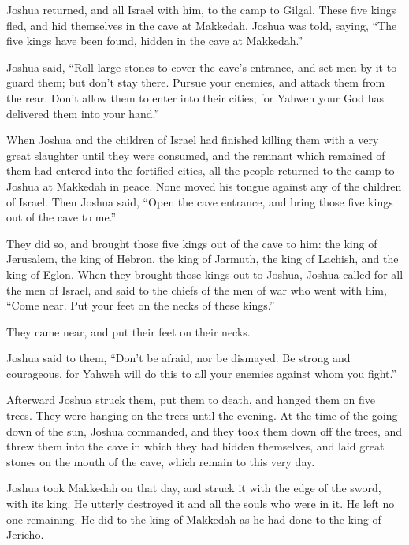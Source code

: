  Joshua returned, and all Israel with him, to the camp to
Gilgal.  These five kings fled, and hid themselves in the
cave at Makkedah.  Joshua was told, saying, ``The five
kings have been found, hidden in the cave at Makkedah.''

 Joshua said, ``Roll large stones to cover the cave's
entrance, and set men by it to guard them;  but don't stay
there. Pursue your enemies, and attack them from the rear. Don't allow
them to enter into their cities; for Yahweh your God has delivered them
into your hand.''

 When Joshua and the children of Israel had finished
killing them with a very great slaughter until they were consumed, and
the remnant which remained of them had entered into the fortified
cities,  all the people returned to the camp to Joshua at
Makkedah in peace. None moved his tongue against any of the children of
Israel.  Then Joshua said, ``Open the cave entrance, and
bring those five kings out of the cave to me.''

 They did so, and brought those five kings out of the cave
to him: the king of Jerusalem, the king of Hebron, the king of Jarmuth,
the king of Lachish, and the king of Eglon.  When they
brought those kings out to Joshua, Joshua called for all the men of
Israel, and said to the chiefs of the men of war who went with him,
``Come near. Put your feet on the necks of these kings.''

They came near, and put their feet on their necks.

 Joshua said to them, ``Don't be afraid, nor be dismayed.
Be strong and courageous, for Yahweh will do this to all your enemies
against whom you fight.''

 Afterward Joshua struck them, put them to death, and
hanged them on five trees. They were hanging on the trees until the
evening.  At the time of the going down of the sun, Joshua
commanded, and they took them down off the trees, and threw them into
the cave in which they had hidden themselves, and laid great stones on
the mouth of the cave, which remain to this very day.

 Joshua took Makkedah on that day, and struck it with the
edge of the sword, with its king. He utterly destroyed it and all the
souls who were in it. He left no one remaining. He did to the king of
Makkedah as he had done to the king of Jericho.

